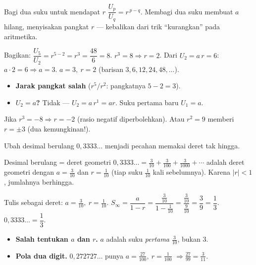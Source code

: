 \begin{ingat}{Bagi dua suku untuk mendapat $r$}
$\dfrac{U_p}{U_q}=r^{\,p-q}$. Membagi dua suku membuat $a$ hilang, menyisakan
pangkat $r$ --- kebalikan dari trik ``kurangkan'' pada aritmetika.
\end{ingat}

\jawab
{} Bagikan: $\dfrac{U_5}{U_2}=r^{5-2}=r^3=\dfrac{48}{6}=8$.
 $r^3=8 \Rightarrow r=2$.
 Dari $U_2=a\,r=6$: $a\cdot2=6 \Rightarrow a=3$.
\jadi $a=3,\ r=2$ (barisan $3,6,12,24,48,\dots$).

\begin{jebakan}
\begin{itemize}[leftmargin=*,topsep=2pt]
  \item \textbf{Jarak pangkat salah} ($r^5/r^2$: pangkatnya $5-2=3$).
  \item \textbf{$U_2=a$?} Tidak --- $U_2=a\,r^1=ar$. Suku pertama baru $U_1=a$.
\end{itemize}
\end{jebakan}

\begin{variasi}
Jika $r^3=-8\Rightarrow r=-2$ (rasio negatif diperbolehkan). Atau $r^2=9$
memberi $r=\pm3$ (dua kemungkinan!).
\end{variasi}

\begin{soalbox}{}
Ubah desimal berulang $0{,}3333\ldots$ menjadi pecahan memakai deret tak hingga.
\end{soalbox}

\begin{ingat}{Desimal berulang = deret geometri}
$0{,}3333\ldots = \frac{3}{10}+\frac{3}{100}+\frac{3}{1000}+\cdots$ adalah deret
geometri dengan $a=\frac{3}{10}$ dan $r=\frac{1}{10}$ (tiap suku $\frac{1}{10}$
kali sebelumnya). Karena $|r|<1$, jumlahnya berhingga.
\end{ingat}

\jawab
{} Tulis sebagai deret: $a=\frac{3}{10},\ r=\frac{1}{10}$.
 $S_\infty=\dfrac{a}{1-r}=\dfrac{\frac{3}{10}}{1-\frac{1}{10}}
=\dfrac{\frac{3}{10}}{\frac{9}{10}}=\dfrac{3}{9}=\dfrac13$.
\jadi $0{,}3333\ldots=\dfrac13$.

\begin{jebakan}
\begin{itemize}[leftmargin=*,topsep=2pt]
  \item \textbf{Salah tentukan $a$ dan $r$.} $a$ adalah suku \emph{pertama}
  $\frac{3}{10}$, bukan $3$.
  \item \textbf{Pola dua digit.} $0{,}272727\ldots$ punya $a=\frac{27}{100},\
  r=\frac{1}{100}$ $\Rightarrow \frac{27}{99}=\frac{3}{11}$.
\end{itemize}
\end{jebakan}

